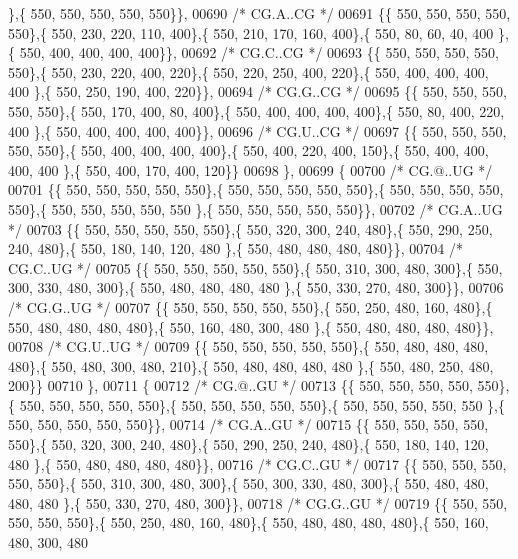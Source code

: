 \begin{DoxyCode}
      \},\{ 550, 550, 550, 550, 550\}\},
00690 \textcolor{comment}{/* CG.A..CG */}
00691 \{\{ 550, 550, 550, 550, 550\},\{ 550, 230, 220, 110, 400\},\{ 550, 210, 170, 160, 400\},\{ 550,  80,  60,  40, 400
      \},\{ 550, 400, 400, 400, 400\}\},
00692 \textcolor{comment}{/* CG.C..CG */}
00693 \{\{ 550, 550, 550, 550, 550\},\{ 550, 230, 220, 400, 220\},\{ 550, 220, 250, 400, 220\},\{ 550, 400, 400, 400, 400
      \},\{ 550, 250, 190, 400, 220\}\},
00694 \textcolor{comment}{/* CG.G..CG */}
00695 \{\{ 550, 550, 550, 550, 550\},\{ 550, 170, 400,  80, 400\},\{ 550, 400, 400, 400, 400\},\{ 550,  80, 400, 220, 400
      \},\{ 550, 400, 400, 400, 400\}\},
00696 \textcolor{comment}{/* CG.U..CG */}
00697 \{\{ 550, 550, 550, 550, 550\},\{ 550, 400, 400, 400, 400\},\{ 550, 400, 220, 400, 150\},\{ 550, 400, 400, 400, 400
      \},\{ 550, 400, 170, 400, 120\}\}
00698 \},
00699 \{
00700 \textcolor{comment}{/* CG.@..UG */}
00701 \{\{ 550, 550, 550, 550, 550\},\{ 550, 550, 550, 550, 550\},\{ 550, 550, 550, 550, 550\},\{ 550, 550, 550, 550, 550
      \},\{ 550, 550, 550, 550, 550\}\},
00702 \textcolor{comment}{/* CG.A..UG */}
00703 \{\{ 550, 550, 550, 550, 550\},\{ 550, 320, 300, 240, 480\},\{ 550, 290, 250, 240, 480\},\{ 550, 180, 140, 120, 480
      \},\{ 550, 480, 480, 480, 480\}\},
00704 \textcolor{comment}{/* CG.C..UG */}
00705 \{\{ 550, 550, 550, 550, 550\},\{ 550, 310, 300, 480, 300\},\{ 550, 300, 330, 480, 300\},\{ 550, 480, 480, 480, 480
      \},\{ 550, 330, 270, 480, 300\}\},
00706 \textcolor{comment}{/* CG.G..UG */}
00707 \{\{ 550, 550, 550, 550, 550\},\{ 550, 250, 480, 160, 480\},\{ 550, 480, 480, 480, 480\},\{ 550, 160, 480, 300, 480
      \},\{ 550, 480, 480, 480, 480\}\},
00708 \textcolor{comment}{/* CG.U..UG */}
00709 \{\{ 550, 550, 550, 550, 550\},\{ 550, 480, 480, 480, 480\},\{ 550, 480, 300, 480, 210\},\{ 550, 480, 480, 480, 480
      \},\{ 550, 480, 250, 480, 200\}\}
00710 \},
00711 \{
00712 \textcolor{comment}{/* CG.@..GU */}
00713 \{\{ 550, 550, 550, 550, 550\},\{ 550, 550, 550, 550, 550\},\{ 550, 550, 550, 550, 550\},\{ 550, 550, 550, 550, 550
      \},\{ 550, 550, 550, 550, 550\}\},
00714 \textcolor{comment}{/* CG.A..GU */}
00715 \{\{ 550, 550, 550, 550, 550\},\{ 550, 320, 300, 240, 480\},\{ 550, 290, 250, 240, 480\},\{ 550, 180, 140, 120, 480
      \},\{ 550, 480, 480, 480, 480\}\},
00716 \textcolor{comment}{/* CG.C..GU */}
00717 \{\{ 550, 550, 550, 550, 550\},\{ 550, 310, 300, 480, 300\},\{ 550, 300, 330, 480, 300\},\{ 550, 480, 480, 480, 480
      \},\{ 550, 330, 270, 480, 300\}\},
00718 \textcolor{comment}{/* CG.G..GU */}
00719 \{\{ 550, 550, 550, 550, 550\},\{ 550, 250, 480, 160, 480\},\{ 550, 480, 480, 480, 480\},\{ 550, 160, 480, 300, 480

\end{DoxyCode}
